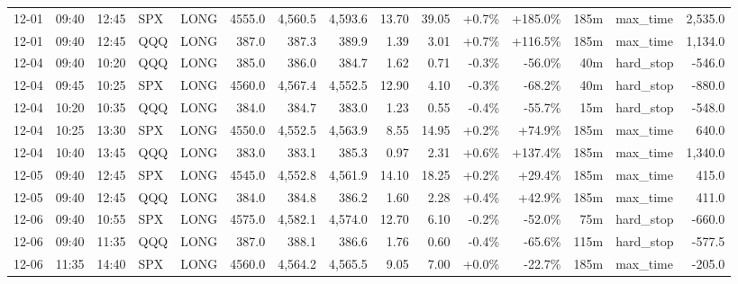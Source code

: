 \documentclass[11pt,a4paper,twoside]{article}
\begin{document}
\begin{landscape}
\begin{center}
\begin{longtable}{>{\color{txtmain}}l l l l l r r r r r r r r >{\color{txtmain}}l r}
12-01 & 09:40 & 12:45 & SPX & LONG & 4555.0 & 4,560.5 & 4,593.6 & 13.70 & 39.05 & \textcolor{wingreen}{+0.7\%} & \textcolor{wingreen}{+185.0\%} & 185m & max\_time & \textcolor{wingreen}{2,535.0} \\
12-01 & 09:40 & 12:45 & QQQ & LONG & 387.0 & 387.3 & 389.9 & 1.39 & 3.01 & \textcolor{wingreen}{+0.7\%} & \textcolor{wingreen}{+116.5\%} & 185m & max\_time & \textcolor{wingreen}{1,134.0} \\
12-04 & 09:40 & 10:20 & QQQ & LONG & 385.0 & 386.0 & 384.7 & 1.62 & 0.71 & \textcolor{lossred}{-0.3\%} & \textcolor{lossred}{-56.0\%} & 40m & hard\_stop & \textcolor{lossred}{-546.0} \\
12-04 & 09:45 & 10:25 & SPX & LONG & 4560.0 & 4,567.4 & 4,552.5 & 12.90 & 4.10 & \textcolor{lossred}{-0.3\%} & \textcolor{lossred}{-68.2\%} & 40m & hard\_stop & \textcolor{lossred}{-880.0} \\
12-04 & 10:20 & 10:35 & QQQ & LONG & 384.0 & 384.7 & 383.0 & 1.23 & 0.55 & \textcolor{lossred}{-0.4\%} & \textcolor{lossred}{-55.7\%} & 15m & hard\_stop & \textcolor{lossred}{-548.0} \\
12-04 & 10:25 & 13:30 & SPX & LONG & 4550.0 & 4,552.5 & 4,563.9 & 8.55 & 14.95 & \textcolor{wingreen}{+0.2\%} & \textcolor{wingreen}{+74.9\%} & 185m & max\_time & \textcolor{wingreen}{640.0} \\
12-04 & 10:40 & 13:45 & QQQ & LONG & 383.0 & 383.1 & 385.3 & 0.97 & 2.31 & \textcolor{wingreen}{+0.6\%} & \textcolor{wingreen}{+137.4\%} & 185m & max\_time & \textcolor{wingreen}{1,340.0} \\
12-05 & 09:40 & 12:45 & SPX & LONG & 4545.0 & 4,552.8 & 4,561.9 & 14.10 & 18.25 & \textcolor{wingreen}{+0.2\%} & \textcolor{wingreen}{+29.4\%} & 185m & max\_time & \textcolor{wingreen}{415.0} \\
12-05 & 09:40 & 12:45 & QQQ & LONG & 384.0 & 384.8 & 386.2 & 1.60 & 2.28 & \textcolor{wingreen}{+0.4\%} & \textcolor{wingreen}{+42.9\%} & 185m & max\_time & \textcolor{wingreen}{411.0} \\
12-06 & 09:40 & 10:55 & SPX & LONG & 4575.0 & 4,582.1 & 4,574.0 & 12.70 & 6.10 & \textcolor{lossred}{-0.2\%} & \textcolor{lossred}{-52.0\%} & 75m & hard\_stop & \textcolor{lossred}{-660.0} \\
12-06 & 09:40 & 11:35 & QQQ & LONG & 387.0 & 388.1 & 386.6 & 1.76 & 0.60 & \textcolor{lossred}{-0.4\%} & \textcolor{lossred}{-65.6\%} & 115m & hard\_stop & \textcolor{lossred}{-577.5} \\
12-06 & 11:35 & 14:40 & SPX & LONG & 4560.0 & 4,564.2 & 4,565.5 & 9.05 & 7.00 & \textcolor{wingreen}{+0.0\%} & \textcolor{lossred}{-22.7\%} & 185m & max\_time & \textcolor{lossred}{-205.0} \\

\end{longtable}
\end{center}
\end{landscape}
\end{document}
